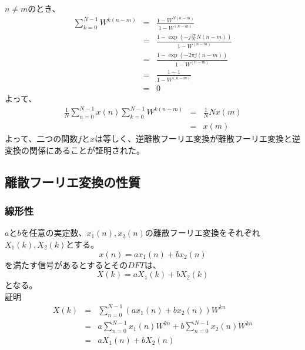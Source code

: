 \documentclass[a4paper]{jsarticle}
\begin{document}
$n \neq m$のとき、
\begin{eqnarray}
	\sum _{k = 0} ^{N - 1} W ^{k \left( n - m \right) } &=& \frac { 1 - W ^{ N \left( n - m \right) } } { 1 - W ^{ \left( n - m \right) } } \nonumber \\
	&=& \frac { 1 - \exp( -j \frac { 2 \pi } { N } N \left( n - m \right) ) } { 1 - W ^{ \left( n - m \right) } } \nonumber \\
	&=& \frac { 1 - \exp( -2 \pi j \left( n - m \right) ) } { 1 - W ^{ \left( n - m \right) } } \nonumber \\
	&=& \frac { 1 - 1 } { 1 - W ^{ \left( n - m \right) } } \nonumber \\
	&=& 0
\end{eqnarray}
よって、
\begin{eqnarray}
	\frac{1}{N} \sum _{n = 0} ^{N - 1} x \left( n \right) \sum _{k = 0} ^{N - 1} W ^{k \left( n - m \right) } &=& \frac { 1 } { N } N x \left( m \right) \nonumber \\
	&=& x \left( m \right)
\end{eqnarray}
よって、二つの関数$f$と$x$は等しく、逆離散フーリエ変換が離散フーリエ変換と逆変換の関係にあることが証明された。
\subsection{離散フーリエ変換の性質}
\subsubsection{線形性}
$a$と$b$を任意の実定数、$x_1 \left( n \right), x_2 \left( n \right)$の離散フーリエ変換をそれぞれ$X_1 \left( k \right), X_2 \left( k \right)$とする。
\begin{equation}
x \left( n \right) = ax_1 \left( n \right) + bx_2 \left( n \right)
\end{equation}
を満たす信号があるとするとその$DFT$は、
\begin{equation}
X \left( k \right) = aX_1 \left( k \right) + bX_2 \left( k \right)
\end{equation}
となる。\\
証明
\begin{eqnarray}
	X \left( k \right) &=& \sum _{n = 0} ^{N - 1} \left( ax_1 \left( n \right) + bx_2 \left( n \right) \right) W ^{kn} \nonumber \\
	&=& a \sum _{n = 0} ^{N -1} x_1 \left( n \right) W ^{kn} + b \sum _{n = 0} ^{N - 1} x_2 \left( n \right) W ^{kn} \nonumber \\
	&=& aX_1 \left( n \right) + bX_2 \left( n \right)
\end{eqnarray}
\end{document}

